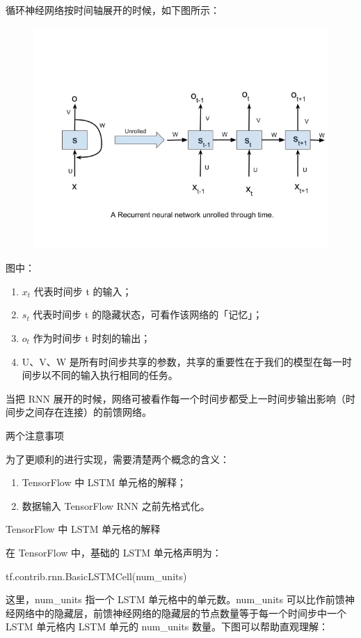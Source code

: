 \documentclass{article}
\begin{document}
循环神经网络按时间轴展开的时候，如下图所示：
\begin{figure}[H]
\includegraphics[scale=0.5]{rnn_unroll.png}
\end{figure}
图中：
\begin{enumerate}
\item $x_t$ 代表时间步 t 的输入；
\item $s_t$ 代表时间步 t 的隐藏状态，可看作该网络的「记忆」；
\item $o_t$ 作为时间步 t 时刻的输出；
\item U、V、W 是所有时间步共享的参数，共享的重要性在于我们的模型在每一时间步以不同的输入执行相同的任务。
\end{enumerate}
当把 RNN 展开的时候，网络可被看作每一个时间步都受上一时间步输出影响（时间步之间存在连接）的前馈网络。

两个注意事项

为了更顺利的进行实现，需要清楚两个概念的含义：
\begin{enumerate}
\item TensorFlow 中 LSTM 单元格的解释；
\item 数据输入 TensorFlow RNN 之前先格式化。
\end{enumerate}

TensorFlow 中 LSTM 单元格的解释

在 TensorFlow 中，基础的 LSTM 单元格声明为：

tf.contrib.rnn.BasicLSTMCell(num\_units)


这里，num\_units 指一个 LSTM 单元格中的单元数。num\_units 可以比作前馈神经网络中的隐藏层，前馈神经网络的隐藏层的节点数量等于每一个时间步中一个 LSTM 单元格内 LSTM 单元的 num\_units 数量。下图可以帮助直观理解：
\end{document}
